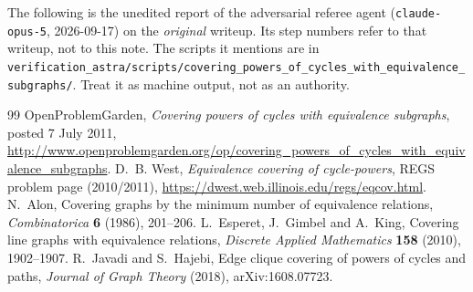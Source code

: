 \documentclass[11pt,a4paper]{article}
\theoremstyle{plain}
\theoremstyle{definition}
\theoremstyle{remark}
\begin{document}
\begin{tcolorbox}[colback=gray!8,colframe=gray!50,boxrule=0.4pt,arc=2pt]
\small The following is the unedited report of the adversarial referee agent
(\texttt{claude-opus-5}, 2026-09-17) on the \emph{original} writeup.  Its step numbers
refer to that writeup, not to this note.  The scripts it mentions are in
\texttt{verification\_astra/scripts/covering\_powers\_of\_cycles\_with\_equivalence\_subgraphs/}.
Treat it as machine output, not as an authority.
\end{tcolorbox}



\begin{thebibliography}{99}
\small
\setlength{\itemsep}{2pt}
 OpenProblemGarden, \emph{Covering powers of cycles with equivalence subgraphs}, posted 7 July 2011, \url{http://www.openproblemgarden.org/op/covering_powers_of_cycles_with_equivalence_subgraphs}.
 D.~B. West, \emph{Equivalence covering of cycle-powers}, REGS problem page (2010/2011), \url{https://dwest.web.illinois.edu/regs/eqcov.html}.
 N.~Alon, Covering graphs by the minimum number of equivalence relations, \emph{Combinatorica} \textbf{6} (1986), 201--206.
 L.~Esperet, J.~Gimbel and A.~King, Covering line graphs with equivalence relations, \emph{Discrete Applied Mathematics} \textbf{158} (2010), 1902--1907.
 R.~Javadi and S.~Hajebi, Edge clique covering of powers of cycles and paths, \emph{Journal of Graph Theory} (2018), arXiv:1608.07723.
\end{thebibliography}
\end{document}
